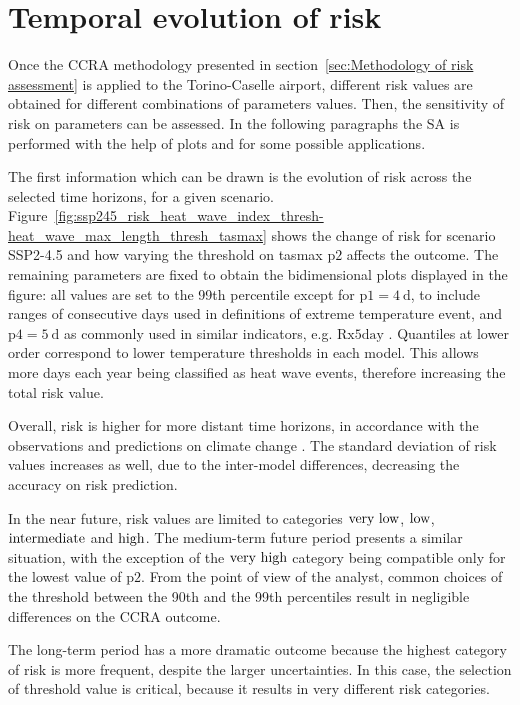 \section{Temporal evolution of risk}
Once the \gls{CCRA} methodology presented in section~\ref{sec:Methodology of risk assessment} is applied to the Torino-Caselle airport, different \gls{risk} values are obtained for different combinations of parameters values.
Then, the sensitivity of risk on parameters can be assessed. In the following paragraphs the \gls{SA} is performed with the help of plots and for some possible applications.

The first information which can be drawn is the evolution of \gls{risk} across the selected time horizons, for a given scenario. Figure~\ref{fig:ssp245_risk_heat_wave_index_thresh-heat_wave_max_length_thresh_tasmax} shows the change of risk for scenario SSP2-4.5 and how varying the threshold on \gls{tasmax} $\mathrm{p2}$ affects the outcome.
The remaining parameters are fixed to obtain the bidimensional plots displayed in the figure: all values are set to the 99th percentile except for $\mathrm{p1} = \qty{4}{\day}$, to include ranges of consecutive days used in definitions of extreme temperature event, and $\mathrm{p4} = \qty{5}{\day}$ as commonly used in similar indicators, e.g. $\mathrm{Rx5day}$ \cite[2208]{2021GutierrezAnnexVI}.
Quantiles at lower order correspond to lower temperature thresholds in each model. This allows more days each year being classified as heat wave events, therefore increasing the total risk value.

Overall, risk is higher for more distant time horizons, in accordance with the observations and predictions on climate change \cite[8-19]{2022IPCCClimateChange}. The standard deviation of risk values increases as well, due to the inter-model differences, decreasing the accuracy on risk prediction.

In the near future, risk values are limited to categories $\text{very low}$, $\text{low}$, $\text{intermediate}$ and $\text{high}$. The medium-term future period presents a similar situation, with the exception of the $\text{very high}$ category being compatible only for the lowest value of $\mathrm{p2}$. From the point of view of the analyst, common choices of the threshold between the 90th and the 99th percentiles result in negligible differences on the \gls{CCRA} outcome.

The long-term period has a more dramatic outcome because the highest category of risk is more frequent, despite the larger uncertainties. In this case, the selection of threshold value is critical, because it results in very different risk categories.

